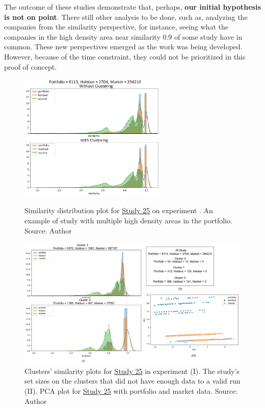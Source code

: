 The outcome of these studies demonstrate that, perhaps, \textbf{our initial hypothesis is not on point}. There still other analysis to be done, such as, analyzing the companies from the similarity perspective, for instance, seeing what the companies in the high density area near similarity 0.9 of some study have in common. These new perspectives emerged as the work was being developed. However, because of the time constraint, they could not be prioritized in this proof of concept. 
\begin{figure}[h]
   \centering
   \includegraphics[width=7cm]{fig/ch4-bump-study-25.png}
   \caption{Similarity distribution plot for \underline{Study 25} on experiment \nameExperimentII{}. An example of study with multiple high density areas in the portfolio. Source: Author}
   \label{fig:bump-study-25}

   \includegraphics[width=\linewidth]{fig/ch4-study-25-clusters-pca.png}
   \caption{Clusters' similarity plots for \underline{Study 25} in experiment \nameExperimentI{} (I). The study's set sizes on the clusters that did not have enough data to a valid run (II). PCA plot for \underline{Study 25} with portfolio and market data. Source: Author}
   \label{fig:study-25-clusters-pca}
\end{figure}

